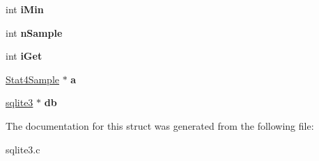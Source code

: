 \begin{DoxyCompactItemize}
\item 
int {\bfseries i\+Min}\hypertarget{structStat4Accum_a9935fae376aa4010a0d205e7a3283d36}{}\label{structStat4Accum_a9935fae376aa4010a0d205e7a3283d36}

\item 
int {\bfseries n\+Sample}\hypertarget{structStat4Accum_ae96fc8b759131bd3d968086a009a9170}{}\label{structStat4Accum_ae96fc8b759131bd3d968086a009a9170}

\item 
int {\bfseries i\+Get}\hypertarget{structStat4Accum_aee70ce1c45daa00581265d27337bce5e}{}\label{structStat4Accum_aee70ce1c45daa00581265d27337bce5e}

\item 
\hyperlink{structStat4Sample}{Stat4\+Sample} $\ast$ {\bfseries a}\hypertarget{structStat4Accum_a921a2a1d92fe8113626bde517d004278}{}\label{structStat4Accum_a921a2a1d92fe8113626bde517d004278}

\item 
\hyperlink{structsqlite3}{sqlite3} $\ast$ {\bfseries db}\hypertarget{structStat4Accum_af0ae3ddd7a24a925ebe090db6f06a12b}{}\label{structStat4Accum_af0ae3ddd7a24a925ebe090db6f06a12b}

\end{DoxyCompactItemize}


The documentation for this struct was generated from the following file\+:\begin{DoxyCompactItemize}
\item 
sqlite3.\+c\end{DoxyCompactItemize}
